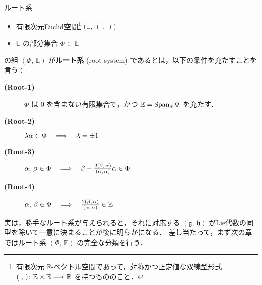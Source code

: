 \documentclass[rep_main]{subfiles}
\begin{document}
\begin{myaxiom}[label=ax:root-system,breakable]{ルート系}
	\begin{itemize}
		\item 有限次元Euclid空間\footnote{有限次元 $\mathbb{R}$-ベクトル空間であって，対称かつ正定値な双線型形式 $(\;,\, ) \colon \mathbb{E} \times \mathbb{E} \longrightarrow \mathbb{R}$ を持つもののこと．} $\bigl(\mathbb{E},\, (\;,\, )\bigr)$ 
		\item $\mathbb{E}$ の部分集合 $\Phi \subset \mathbb{E}$
	\end{itemize}
	の組 $(\Phi,\, \mathbb{E})$ が\textbf{ルート系} (root system) であるとは，以下の条件を充たすことを言う：
	\begin{description}
		\item[\textbf{(Root-1)}] $\Phi$ は $0$ を含まない有限集合で，かつ $\mathbb{E} = \operatorname{Span}_{\mathbb{R}} \Phi$ を充たす．
		\item[\textbf{(Root-2)}] $\lambda \alpha \in \Phi \quad \Longrightarrow \quad \lambda = \pm 1$
		\item[\textbf{(Root-3)}] $\alpha,\, \beta \in \Phi \quad \Longrightarrow \quad \beta - \frac{2(\beta,\, \alpha)}{(\alpha,\, \alpha)} \alpha \in \Phi$
		\item[\textbf{(Root-4)}] $\alpha,\, \beta \in \Phi \quad \Longrightarrow \quad \frac{2(\beta,\, \alpha)}{(\alpha,\, \alpha)} \in \mathbb{Z}$
	\end{description}
\end{myaxiom}

実は，勝手なルート系が与えられると，それに対応する $(\mathfrak{g},\, \mathfrak{h})$ がLie代数の同型を除いて一意に決まることが後に明らかになる．
差し当たって，まず次の章ではルート系 $(\Phi,\, \mathbb{E})$ の完全な分類を行う．
\end{document}
